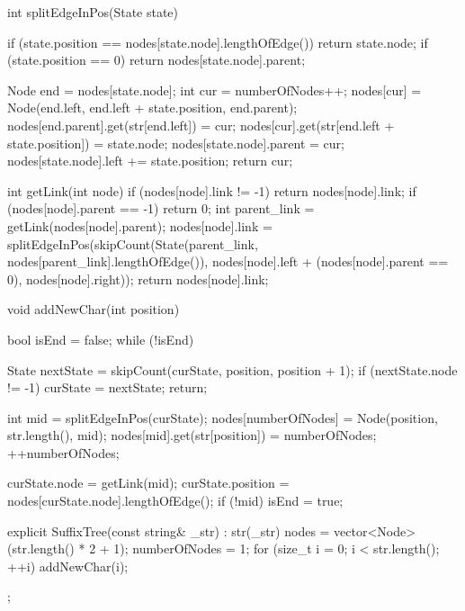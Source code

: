 \documentclass[12pt, titlepage]{article}
\begin{document}
\begin{cppcode}
{    int splitEdgeInPos(State state) {
        if (state.position == nodes[state.node].lengthOfEdge())
            return state.node;
        if (state.position == 0)
            return nodes[state.node].parent;

        Node end = nodes[state.node];
        int cur = numberOfNodes++;
        nodes[cur] = Node(end.left, end.left + state.position, end.parent);
        nodes[end.parent].get(str[end.left]) = cur;
        nodes[cur].get(str[end.left + state.position]) = state.node;
        nodes[state.node].parent = cur;
        nodes[state.node].left += state.position;
        return cur;
    }    

    int getLink(int node) {
        if (nodes[node].link != -1)
            return nodes[node].link;
        if (nodes[node].parent == -1)
            return 0;
        int parent_link = getLink(nodes[node].parent);
        nodes[node].link = splitEdgeInPos(skipCount(State(parent_link,  
                                    nodes[parent_link].lengthOfEdge()), 
                                    nodes[node].left + (nodes[node].parent == 0), 
                                    nodes[node].right));
        return nodes[node].link;
    }
     
    void addNewChar(int position) {
        bool isEnd = false;
        while (!isEnd) {
            State nextState = skipCount(curState, position, position + 1);
            if (nextState.node != -1) {
                curState = nextState;
                return;
            }

            int mid = splitEdgeInPos(curState);
            nodes[numberOfNodes] = Node(position, str.length(), mid);
            nodes[mid].get(str[position]) = numberOfNodes;
            ++numberOfNodes;
     
            curState.node = getLink(mid);
            curState.position = nodes[curState.node].lengthOfEdge();
            if (!mid)
                isEnd = true;
        }
    }

    explicit SuffixTree(const string& _str) : str(_str) {
        nodes = vector<Node> (str.length() * 2 + 1);
        numberOfNodes = 1;
        for (size_t i = 0; i < str.length(); ++i) {
            addNewChar(i);
        }
    }    
};
\end{cppcode}
\end{document}
